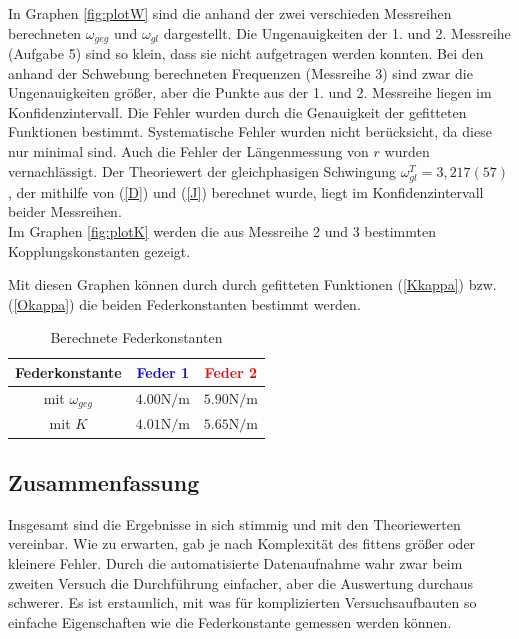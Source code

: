 \documentclass[11pt, a4paper]{article}
\begin{document}
    In Graphen \ref{fig:plotW} sind die anhand der zwei verschieden Messreihen
    berechneten $\omega_{geg}$ und $\omega_{gl}$ dargestellt. Die Ungenauigkeiten der 1. und 2. Messreihe (Aufgabe 5) sind so klein,
    dass sie nicht aufgetragen werden konnten. Bei den anhand der Schwebung berechneten Frequenzen (Messreihe 3)
    sind zwar die Ungenauigkeiten größer, aber die Punkte aus der 1. und 2. Messreihe liegen im Konfidenzintervall.
    Die Fehler wurden durch die Genauigkeit der gefitteten Funktionen bestimmt. Systematische Fehler wurden
    nicht berücksicht, da diese nur minimal sind. Auch die Fehler der Längenmessung von $r$ wurden vernachlässigt.
    Der Theoriewert der gleichphasigen Schwingung $\omega_{gl}^T = 3,217(57)$,
    der mithilfe von (\ref{D}) und (\ref{J}) berechnet wurde,
    liegt im Konfidenzintervall beider Messreihen. \\
    
    Im Graphen \ref{fig:plotK} werden die aus Messreihe 2 und 3 bestimmten Kopplungskonstanten gezeigt.

    Mit diesen Graphen können durch durch gefitteten Funktionen (\ref{Kkappa}) bzw. (\ref{Okappa}) die beiden
    Federkonstanten bestimmt werden.
    \begin{table}[H]
        \centering
        \begin{tabular}{c c c}
            Federkonstante & \textcolor{blue}{Feder 1} & \textcolor{red}{Feder 2} \\ \hline
            mit $\omega_{geg}$ & $4.00 \si{\newton\per\metre}$ & $5.90\si{\newton\per\metre}$\\
            mit $K$ & $4.01 \si{\newton\per\metre}$ & $5.65\si{\newton\per\metre}$\\
            
        \end{tabular}
        \caption{Berechnete Federkonstanten}
    \end{table}


    \subsection{Zusammenfassung}
    Insgesamt sind die Ergebnisse in sich stimmig und mit den Theoriewerten vereinbar. Wie zu erwarten, gab
    je nach Komplexität des fittens größer oder kleinere Fehler. Durch die automatisierte Datenaufnahme
    wahr zwar beim zweiten Versuch die Durchführung einfacher, aber die Auswertung durchaus schwerer.
    Es ist erstaunlich, mit was für komplizierten
    Versuchsaufbauten so einfache Eigenschaften wie die Federkonstante gemessen werden können.
\end{document}
